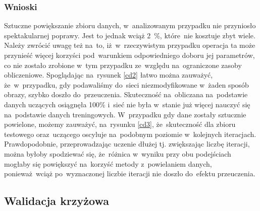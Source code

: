 \subsubsection{Wnioski}
Sztuczne powiększanie zbioru danych, w~analizowanym przypadku nie przyniosło spektakularnej poprawy. Jest to jednak wciąż 2~\%, które~nie kosztuje zbyt wiele. Należy zwrócić uwagę też na~to, iż~w~rzeczywistym przypadku operacja ta może przynieść więcej korzyści pod~warunkiem odpowiedniego doboru jej parametrów, co nie zostało zrobione w~tym przypadku ze~względu na~ograniczone zasoby obliczeniowe. Spoglądając na~rysunek \ref{cd2} łatwo można zauważyć, że~w~przypadku, gdy podawaliśmy do~sieci niezmodyfikowane w~żaden sposób obrazy, szybko doszło do~przeuczenia. Skuteczność na~obliczana na~podstawie danych uczących osiągnęła 100\% i~sieć nie była w~stanie już więcej nauczyć się na~podstawie danych treningowych. W~przypadku gdy dane zostały sztucznie powielone, możemy zauważyć, na~rysunku \ref{cd3}, że~skuteczność dla zbioru testowego oraz~uczącego oscyluje na~podobnym poziomie w~kolejnych iteracjach. Prawdopodobnie, przeprowadzając uczenie dłużej tj. zwiększając liczbę iteracji, można byłoby spodziewać się, że~różnica w~wyniku przy obu podejściach mogłaby się powiększyć na~korzyść metody z~powielaniem danych, ponieważ~wciąż po~wyznaczonej liczbie iteracji nie doszło do~efektu przeuczenia.

\subsection{Walidacja krzyżowa}\label{cvChapter}
